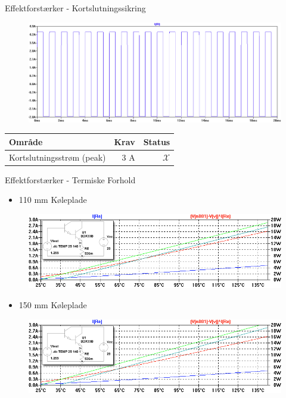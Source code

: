 \begin{frame}{Effektforstærker - Kortslutningssikring}

\begin{figure}[h]
\centering
\includegraphics[width=\textwidth]{images/kortslut-graf.png}
\end{figure}

\scriptsize{\begin{table}[h]
\centering
\begin{tabular}{l|r|r}
\hline\hline
Område & Krav & Status  \\
\hline\hline
Kortslutningsstrøm (peak) & 3 A & $\mathcal{X}$\\
\hline\hline
\end{tabular}
\end{table}}

\end{frame}



\begin{frame}{Effektforstærker - Termiske Forhold}

\begin{itemize}
\item 110 mm Køleplade
\end{itemize}
\begin{figure}[h]
\centering
\includegraphics[width=\textwidth]{images/term-runaway.png}
\end{figure}

\begin{itemize}
\item 150 mm Køleplade 
\end{itemize}
\begin{figure}[h]
\centering
\includegraphics[width=\textwidth]{images/term-runaway1.png}
\end{figure}

\end{frame}


